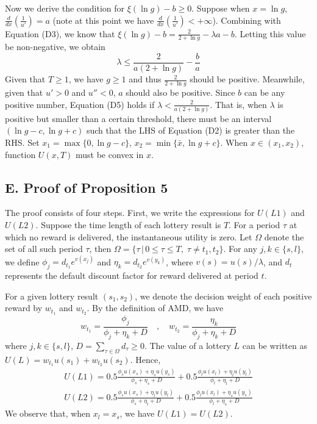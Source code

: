 \documentclass[
  12pt,
]{article}
\begin{document}
Now we derive the condition for \(\xi(\ln g)-b\geq 0\). Suppose when
\(x=\ln g\), \(\frac{d}{dx}\left(\frac{1}{u'}\right)=a\) (note at this
point we have \(\frac{d}{dx}\left(\frac{1}{u'}\right)<+\infty\)).
Combining with Equation (D3), we know that
\(\xi(\ln g)-b =\frac{2}{2+\ln g}-\lambda a-b\). Letting this value be
non-negative, we obtain\[\tag{D5}
\lambda \leq \frac{2}{a(2+\ln g)}-\frac{b}{a}
\]Given that \(T\geq1\), we have \(g\geq 1\) and thus
\(\frac{2}{2+\ln g}\) should be positive. Meanwhile, given that \(u'>0\)
and \(u''<0\), \(a\) should also be positive. Since \(b\) can be any
positive number, Equation (D5) holds if
\(\lambda <\frac{2}{a(2+\ln g)}\). That is, when \(\lambda\) is positive
but smaller than a certain threshold, there must be an interval
\((\ln g-c,\ln g+c)\) such that the LHS of Equation (D2) is greater than
the RHS. Set \(x_1 = \max\{0,\ln g-c\}\),
\(x_2=\min\{\bar{x}, \ln g +c\}\). When \(x\in (x_1,x_2)\), function
\(U(x,T)\) must be convex in \(x\).

\hypertarget{e.-proof-of-proposition-5}{%
\subsection*{E. Proof of Proposition
5}\label{e.-proof-of-proposition-5}}

The proof consists of four steps. First, we write the expressions for
\(U(L1)\) and \(U(L2)\). Suppose the time length of each lottery result
is \(T\). For a period \(\tau\) at which no reward is delivered, the
instantaneous utility is zero. Let \(\Omega\) denote the set of all such
period \(\tau\), then
\(\Omega=\{\tau\,|\,0\leq\tau\leq T,\;\tau \neq t_1,t_2\}\). For any
\(j,k\in\{s,l\}\), we define \(\phi_j=d_{t_1}e^{v(x_j)}\) and
\(\eta_k=d_{t_2}e^{v(y_k)}\), where \(v(s)=u(s)/\lambda\), and \(d_t\)
represents the default discount factor for reward delivered at period
\(t\).

For a given lottery result \((s_1,s_2)\), we denote the decision weight
of each positive reward by \(w_{t_1}\) and \(w_{t_2}\). By the
definition of AMD, we have\[
w_{t_1} = \frac{\phi_j}{\phi_j + \eta_k +D} \quad ,\quad
w_{t_2} = \frac{\eta_k}{\phi_j + \eta_k +D}
\]where \(j,k\in\{s,l\}\), \(D=\sum_{\tau\in\Omega} d_{\tau}\geq 0\).
The value of a lottery \(L\) can be written as
\(U(L)=w_{t_1}u(s_1)+w_{t_2}u(s_2)\). Hence, \[\tag{E1}
\begin{aligned}
U(L1)=0.5\frac{\phi_s u(x_s)+\eta_s u(y_s)}{\phi_s+\eta_s+D} + 0.5\frac{\phi_l u(x_l)+\eta_l u(y_l)}{\phi_l+\eta_l+D} \\
U(L2)=0.5\frac{\phi_s u(x_s)+\eta_l u(y_l)}{\phi_s+\eta_l+D} + 0.5\frac{\phi_l u(x_l)+\eta_s u(y_s)}{\phi_l+\eta_s+D}
\end{aligned}
\]We observe that, when \(x_l=x_s\), we have \(U(L1)=U(L2)\).
\end{document}
